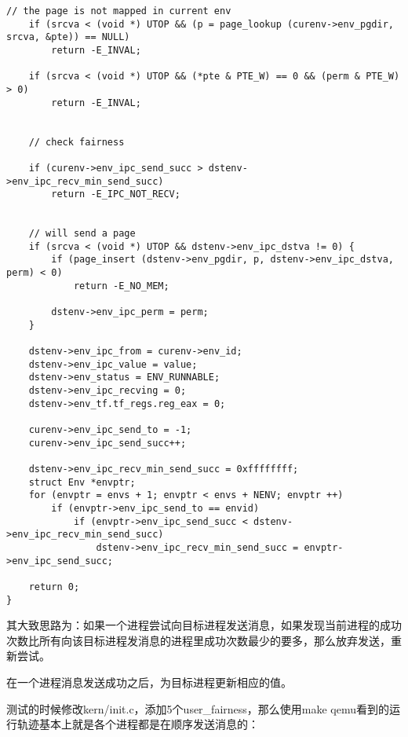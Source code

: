 \documentclass{article}
\begin{document}
\begin{CJK*}{UTF8}{gkai}
\begin{lstlisting}[style=ccode, title={\scriptsize \ttfamily \bfseries kern/syscall.c sys\_ipc\_try\_send()}]
    // the page is not mapped in current env
    if (srcva < (void *) UTOP && (p = page_lookup (curenv->env_pgdir, srcva, &pte)) == NULL)
        return -E_INVAL;

    if (srcva < (void *) UTOP && (*pte & PTE_W) == 0 && (perm & PTE_W) > 0)
        return -E_INVAL;


    // check fairness
    
    if (curenv->env_ipc_send_succ > dstenv->env_ipc_recv_min_send_succ)
        return -E_IPC_NOT_RECV;


    // will send a page
    if (srcva < (void *) UTOP && dstenv->env_ipc_dstva != 0) {
        if (page_insert (dstenv->env_pgdir, p, dstenv->env_ipc_dstva, perm) < 0)
            return -E_NO_MEM;

        dstenv->env_ipc_perm = perm;
    }

    dstenv->env_ipc_from = curenv->env_id;
    dstenv->env_ipc_value = value;
    dstenv->env_status = ENV_RUNNABLE;
    dstenv->env_ipc_recving = 0;
    dstenv->env_tf.tf_regs.reg_eax = 0;

    curenv->env_ipc_send_to = -1;
    curenv->env_ipc_send_succ++;

    dstenv->env_ipc_recv_min_send_succ = 0xffffffff;
    struct Env *envptr;
    for (envptr = envs + 1; envptr < envs + NENV; envptr ++)
        if (envptr->env_ipc_send_to == envid) 
            if (envptr->env_ipc_send_succ < dstenv->env_ipc_recv_min_send_succ)
                dstenv->env_ipc_recv_min_send_succ = envptr->env_ipc_send_succ;

    return 0;
}
\end{lstlisting}

其大致思路为：如果一个进程尝试向目标进程发送消息，如果发现当前进程的成功次数比所有向该目标进程发消息的进程里成功次数最少的要多，那么放弃发送，重新尝试。

在一个进程消息发送成功之后，为目标进程更新相应的值。

\vspace{2em}

测试的时候修改kern/init.c，添加5个user\_fairness，那么使用make qemu看到的运行轨迹基本上就是各个进程都是在顺序发送消息的：



\end{CJK*}
\end{document}
